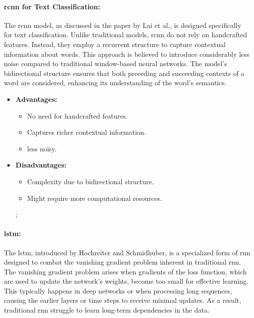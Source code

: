         \paragraph{\acrfull{rcnn} for Text Classification\cite{lai_recurrent_2015}:} The \acrshort{rcnn} model, as discussed in the paper by Lai et al., is designed specifically for text classification. Unlike traditional models, \acrshort{rcnn} do not rely on handcrafted features. Instead, they employ a recurrent structure to capture contextual information about words. This approach is believed to introduce considerably less noise compared to traditional window-based neural networks. The model's bidirectional structure ensures that both preceding and succeeding contexts of a word are considered, enhancing its understanding of the word's semantics.

        \begin{itemize}
            \item \textbf{Advantages:} 
            \begin{itemize}
                \item No need for handcrafted features.
                \item Captures richer contextual information.
                \item less noisy.
            \end{itemize}
            \item \textbf{Disadvantages:} 
            \begin{itemize}
                \item Complexity due to bidirectional structure.
                \item Might require more computational resources.
            \end{itemize}; 
        \end{itemize}

        \paragraph{\acrfull{lstm}\cite{hochreiter_long_1997}:}The \acrshort{lstm}, introduced by Hochreiter and Schmidhuber, is a specialized form of \acrshort{rnn} designed to combat the vanishing gradient problem inherent in traditional \acrshort{rnn}. The vanishing gradient problem arises when gradients of the loss function, which are used to update the network's weights, become too small for effective learning. This typically happens in deep networks or when processing long sequences, causing the earlier layers or time steps to receive minimal updates. As a result, traditional \acrshort{rnn} struggle to learn long-term dependencies in the data.

